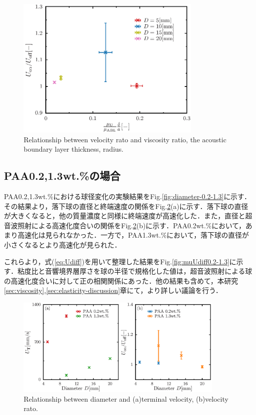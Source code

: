 \begin{figure}[ht]
    \centering
    \includegraphics[width=0.8\textwidth]{./5-Results/diameter-0.5/mu_Udiff.eps}
    \caption{Relationship between velocity rato and viscosity ratio, the acoustic boundary layer thickness, radius.}
    \label{fig:muUdiff0.5}
\end{figure}

\clearpage

\subsection{PAA0.2,1.3wt.\%の場合}
PAA0.2,1.3wt.\%における球径変化の実験結果をFig.\ref{fig:diameter-0.2-1.3}に示す．その結果より，落下球の直径と終端速度の関係をFig.\ref{fig:diaUT0.2-1.3}(a)に示す．落下球の直径が大きくなると，他の質量濃度と同様に終端速度が高速化した．また，直径と超音波照射による高速化度合いの関係をFig.\ref{fig:diaUT0.2-1.3}(b)に示す．PAA0.2wt.\%において，あまり高速化は見られなかった．一方で，PAA1.3wt.\%において，落下球の直径が小さくなるとより高速化が見られた．

これらより，式(\ref{eq:Udiff})を用いて整理した結果をFig.\ref{fig:muUdiff0.2-1.3}に示す．粘度比と音響境界層厚さを球の半径で規格化した値は，超音波照射による球の高速化度合いに対して正の相関関係にあった．他の結果も含めて，本研究\ref{sec:viscosity},\ref{sec:elasticity-discussion}章にて，より詳しい議論を行う．

\begin{figure}[ht]
    \centering
    \includegraphics[width=0.9\textwidth]{./5-Results/diameter-0.2-1.3/diaUT_Udiff.eps}
    \caption{Relationship between diameter and (a)terminal velocity, (b)velocity rato.}
    \label{fig:diaUT0.2-1.3}
\end{figure}

